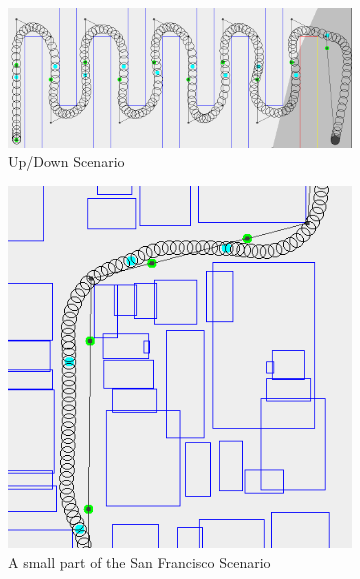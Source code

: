 \begin{figure}
	\centering
	
	\begin{subfigure}[t]{0.8\columnwidth}
        		\includegraphics[width=\textwidth]{img/benchmarkfull}
        		\caption{Up/Down Scenario}
        		\label{fig:scen-updown}
	\end{subfigure}
	\par\bigskip
	\begin{subfigure}[t]{0.40\columnwidth}
        		\includegraphics[width=\textwidth]{img/SF_zoom}
        		\caption{A small part of the San Francisco Scenario}
        		 \label{fig:scen-sf}
	\end{subfigure}	
		\hfil
	\begin{subfigure}[t]{0.40\columnwidth}

\end{subfigure}
\end{figure}
